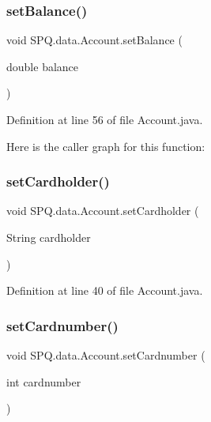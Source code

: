 \subsubsection{\texorpdfstring{set\+Balance()}{setBalance()}}
{\footnotesize\ttfamily void S\+P\+Q.\+data.\+Account.\+set\+Balance (\begin{DoxyParamCaption}\item[{double}]{balance }\end{DoxyParamCaption})}



Definition at line 56 of file Account.\+java.

Here is the caller graph for this function\+:
\mbox{\label{class_s_p_q_1_1data_1_1_account_a4298cea2ae84ed5eae60f67fe61e433a}} 
\subsubsection{\texorpdfstring{set\+Cardholder()}{setCardholder()}}
{\footnotesize\ttfamily void S\+P\+Q.\+data.\+Account.\+set\+Cardholder (\begin{DoxyParamCaption}\item[{String}]{cardholder }\end{DoxyParamCaption})}



Definition at line 40 of file Account.\+java.

\mbox{\label{class_s_p_q_1_1data_1_1_account_afad9822abc150e4238b95280647d3e11}} 
\subsubsection{\texorpdfstring{set\+Cardnumber()}{setCardnumber()}}
{\footnotesize\ttfamily void S\+P\+Q.\+data.\+Account.\+set\+Cardnumber (\begin{DoxyParamCaption}\item[{int}]{cardnumber }\end{DoxyParamCaption})}



